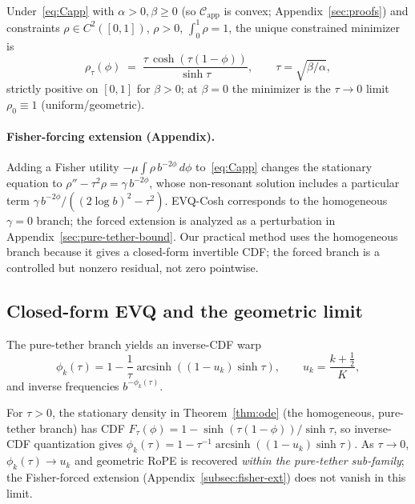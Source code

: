 \begin{theorem}
\label{thm:ode}
Under~\eqref{eq:Capp} with $\alpha{>}0,\beta{\geq}0$ (so $\mathcal{C}_{\mathrm{app}}$ is convex; Appendix~\ref{sec:proofs}) and constraints $\rho\in C^2([0,1])$, $\rho{>}0$, $\int_0^1\rho{=}1$, the unique constrained minimizer is
\begin{equation}
\rho_\tau(\phi) \;=\; \frac{\tau\,\cosh(\tau(1{-}\phi))}{\sinh\tau}, \qquad \tau = \sqrt{\beta/\alpha},
\end{equation}
strictly positive on $[0,1]$ for $\beta{>}0$; at $\beta{=}0$ the minimizer is the $\tau{\to}0$ limit $\rho_0\equiv 1$ (uniform/geometric).
\end{theorem}

\paragraph{Fisher-forcing extension (Appendix).} Adding a Fisher utility $-\mu\!\int\rho\,b^{-2\phi}\,d\phi$ to~\eqref{eq:Capp} changes the stationary equation to $\rho'' - \tau^2\rho = \gamma\,b^{-2\phi}$, whose non-resonant solution includes a particular term $\gamma\,b^{-2\phi}/((2\log b)^2-\tau^2)$. EVQ-Cosh corresponds to the homogeneous $\gamma{=}0$ branch; the forced extension is analyzed as a perturbation in Appendix~\ref{sec:pure-tether-bound}. Our practical method uses the homogeneous branch because it gives a closed-form invertible CDF; the forced branch is a controlled but nonzero residual, not zero pointwise.

\subsection{Closed-form EVQ and the geometric limit}

The pure-tether branch yields an inverse-CDF warp
\begin{equation}
\phi_k(\tau)
=
1 - \frac{1}{\tau}
\operatorname{arcsinh}\!\left((1-u_k)\sinh\tau\right),
\qquad
u_k = \frac{k+\tfrac{1}{2}}{K},
\end{equation}
and inverse frequencies $b^{-\phi_k(\tau)}$.

\begin{theorem}
For $\tau > 0$, the stationary density in Theorem~\ref{thm:ode} (the homogeneous, pure-tether branch) has CDF $F_\tau(\phi) = 1 - \sinh(\tau(1{-}\phi))/\sinh\tau$, so inverse-CDF quantization gives $\phi_k(\tau) = 1 - \tau^{-1}\operatorname{arcsinh}((1{-}u_k)\sinh\tau)$. As $\tau\to 0$, $\phi_k(\tau) \to u_k$ and geometric RoPE is recovered \emph{within the pure-tether sub-family}; the Fisher-forced extension (Appendix~\ref{subsec:fisher-ext}) does not vanish in this limit.
\end{theorem}

